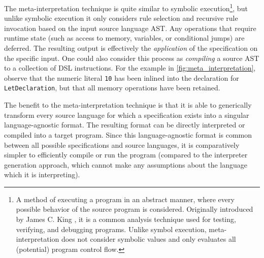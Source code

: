 The meta-interpretation technique is quite similar to symbolic execution\footnote{A method of executing a program in an abstract manner, where every possible behavior of the source program is considered. Originally introduced by James C. King \cite{King76:0}, it is a common analysis technique used for testing, verifying, and debugging programs. Unlike symbol execution, meta-interpretation does not consider symbolic values and only evaluates all (potential) program control flow.}, but unlike symbolic execution it only considers rule selection and recursive rule invocation based on the input source language \ac{AST}. Any operations that require runtime state (such as access to memory, variables, or conditional jumps) are deferred. The resulting output is effectively the \textit{application} of the specification on the specific input. One could also consider this process as \textit{compiling} a source AST to a collection of \ac{DSL} instructions. For the example in \cref{fig:meta_interpretation}, observe that the numeric literal \texttt{10} has been inlined into the declaration for \texttt{LetDeclaration}, but that all memory operations have been retained.

The benefit to the meta-interpretation technique is that it is able to generically transform every source language for which a specification exists into a singular language-agnostic format. The resulting format can be directly interpreted or compiled into a target program. Since this language-agnostic format is common between all possible specifications and source languages, it is comparatively simpler to efficiently compile or run the program (compared to the interpreter generation approach, which cannot make any assumptions about the language which it is interpreting).

